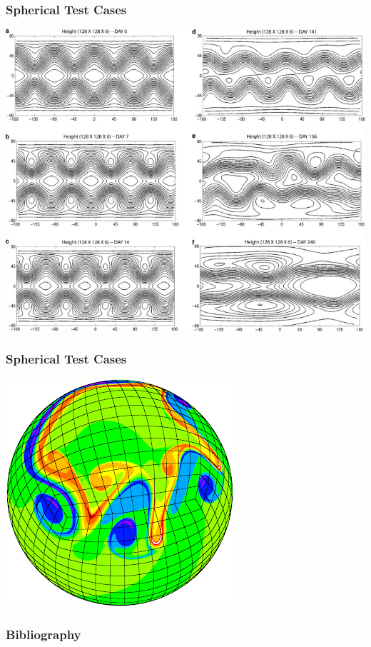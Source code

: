 \documentclass[10pt]{beamer}
\begin{document}
      \begin{frame}
        \frametitle{Spherical Test Cases}
        \centering
        \includegraphics[scale=2.0]{Figures/rossby_test_case.jpg}
      \end{frame}

      \begin{frame}
        \frametitle{Spherical Test Cases}
        \includegraphics[scale=0.5]{Figures/cubed_sphere_vorticity.png}
      \end{frame}

    \begin{frame}[allowframebreaks]
      \frametitle{Bibliography}
      \nocite{*}
      \printbibliography{}
    \end{frame}
\end{document}
